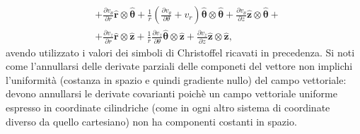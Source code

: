 \begin{example}
\begin{equation}
\begin{aligned}
     & +  \frac{\partial v_\theta}{\partial r}                                     \bm{\hat{r}}      \otimes \bm{\hat{\theta}}  + 
        \frac{1}{r}\left( \frac{\partial v_\theta}{\partial \theta} +  v_r \right) \bm{\hat{\theta}} \otimes \bm{\hat{\theta}}  + 
        \frac{\partial v_\theta}{\partial z}                                       \bm{\hat{z}}      \otimes \bm{\hat{\theta}}  + \\
     & + \frac{\partial v_z}{\partial r}                                           \bm{\hat{r}}      \otimes \bm{\hat{z}}       + 
        \frac{1}{r}\frac{\partial v_z}{\partial \theta}                            \bm{\hat{\theta}} \otimes \bm{\hat{z}}       + 
        \frac{\partial v_z}{\partial z}                                            \bm{\hat{z}}      \otimes \bm{\hat{z}}        ,
\end{aligned}
\end{equation}
 avendo utilizzato i valori dei simboli di Christoffel ricavati in precedenza. Si noti come l'annullarsi delle derivate parziali delle componeti del vettore non implichi l'uniformità (costanza in spazio e quindi gradiente nullo) del campo vettoriale: devono annullarsi le derivate covarianti poichè un campo vettoriale uniforme espresso in coordinate cilindriche (come in ogni altro sistema di coordinate diverso da quello cartesiano) non ha componenti costanti in spazio.
\end{example}

